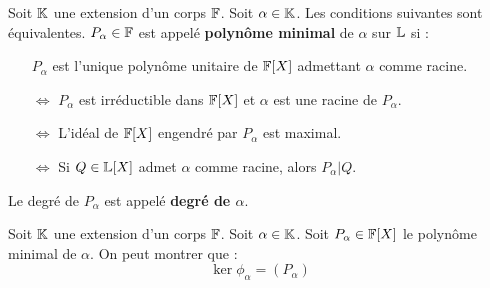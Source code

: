 \begin{definition}
    Soit $\mathbb{K}$ une extension d'un corps $\mathbb{F}$. Soit $ \alpha \in \mathbb{K}$. Les conditions suivantes sont équivalentes. 
    $P_\alpha \in \mathbb{F}$ est appelé \textbf{polynôme minimal} de $ \alpha$ sur $\mathbb{L}$ si : 
        \begin{itemize}
            \item[] $P_\alpha$ est l'unique polynôme unitaire de $\mathbb{F}[X]$ admettant $ \alpha$ comme racine. 
            \item[$ \iff$] $P_\alpha$ est irréductible dans $\mathbb{F}[X]$ et $ \alpha$ est une racine de $P_\alpha$.
            \item[$ \iff$] L'idéal de $\mathbb{F}[X]$ engendré par $P_\alpha$ est maximal. 
            \item[$ \iff$] Si $Q \in \mathbb{L}[X]$ admet $ \alpha$ comme racine, alors $P_\alpha | Q$. 
        \end{itemize}
    Le degré de $P_\alpha$ est appelé \textbf{degré de $\alpha$}. 
\end{definition}

\begin{proposition}
    Soit $\mathbb{K}$ une extension d'un corps $\mathbb{F}$. Soit $ \alpha \in \mathbb{K}$.
    Soit $P_\alpha \in \mathbb{F}[X]$ le polynôme minimal de $ \alpha$. 
    On peut montrer que : 
        \[ \ker \phi_\alpha = (P_\alpha) \] 
\end{proposition}


